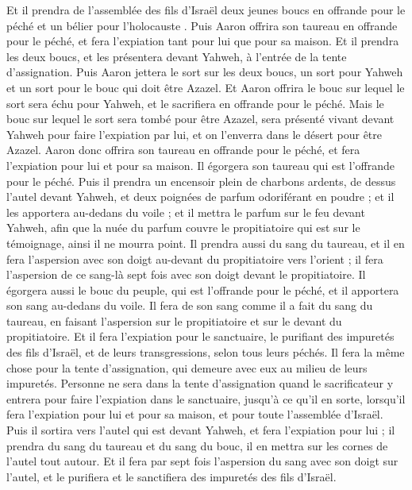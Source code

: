 \begin{multicols}{2}
Et il prendra de l'assemblée des fils d'Israël deux jeunes boucs en offrande pour le péché et un bélier pour l'holocauste .
Puis Aaron offrira son taureau en offrande pour le péché, et fera l’expiation tant pour lui que pour sa maison.
Et il prendra les deux boucs, et les présentera devant Yahweh, à l'entrée de la tente d'assignation.
Puis Aaron jettera le sort sur les deux boucs, un sort pour Yahweh et un sort pour le bouc qui doit être Azazel.
Et Aaron offrira le bouc sur lequel le sort sera échu pour Yahweh, et le sacrifiera en offrande pour le péché.
Mais le bouc sur lequel le sort sera tombé pour être Azazel, sera présenté vivant devant Yahweh pour faire l’expiation par lui, et on l'enverra dans le désert pour être Azazel.
Aaron donc offrira son taureau en offrande pour le péché, et fera l’expiation pour lui et pour sa maison. Il égorgera son taureau qui est l'offrande pour le péché.
Puis il prendra un encensoir plein de charbons ardents, de dessus l'autel devant Yahweh, et deux poignées de parfum odoriférant en poudre ; et il les apportera au-dedans du voile ;
et il mettra le parfum sur le feu devant Yahweh, afin que la nuée du parfum couvre le propitiatoire qui est sur le témoignage, ainsi il ne mourra point.
Il prendra aussi du sang du taureau, et il en fera l’aspersion avec son doigt au-devant du propitiatoire vers l'orient ; il fera l’aspersion de ce sang-là sept fois avec son doigt devant le propitiatoire.
Il égorgera aussi le bouc du peuple, qui est l'offrande pour le péché, et il apportera son sang au-dedans du voile. Il fera de son sang comme il a fait du sang du taureau, en faisant l’aspersion sur le propitiatoire et sur le devant du propitiatoire.
Et il fera l’expiation pour le sanctuaire, le purifiant des impuretés des fils d'Israël, et de leurs transgressions, selon tous leurs péchés. Il fera la même chose pour la tente d'assignation, qui demeure avec eux au milieu de leurs impuretés.
Personne ne sera dans la tente d'assignation quand le sacrificateur y entrera pour faire l’expiation dans le sanctuaire, jusqu'à ce qu'il en sorte, lorsqu'il fera l’expiation pour lui et pour sa maison, et pour toute l'assemblée d'Israël.
Puis il sortira vers l'autel qui est devant Yahweh, et fera l’expiation pour lui ; il prendra du sang du taureau et du sang du bouc, il en mettra sur les cornes de l'autel tout autour.
Et il fera par sept fois l’aspersion du sang avec son doigt sur l'autel, et le purifiera et le sanctifiera des impuretés des fils d'Israël.

\end{multicols}
